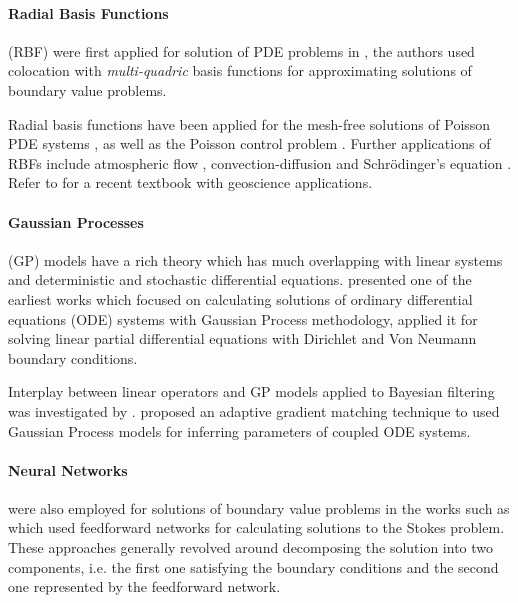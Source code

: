 \paragraph{Radial Basis Functions} (RBF) were first applied for solution of PDE problems in 
\citet{KANSA1990147}, the authors used colocation with \emph{multi-quadric} basis functions for 
approximating solutions of boundary value problems.

Radial basis functions have been applied for the mesh-free solutions of Poisson PDE systems 
\citep{AMINATAEI20082887,DUAN200866,DUAN2006394,CNM:CNM419}, as well as the Poisson control problem 
\citep{Pearson2013}. Further applications of RBFs include atmospheric flow 
\citep{Tillenius2015406}, convection-diffusion \citep{Safdari-Vaighani2015} and Schr\"{o}dinger's 
equation \citep{doi:10.1137/120893975}. Refer to \citet{fornberg2015} for a recent textbook with 
geoscience applications.

\paragraph{Gaussian Processes} (GP) models \citep{Rasmussen:2005:GPM:1162254} have a rich theory 
which has much overlapping with linear systems and deterministic and stochastic differential 
equations. \citet{Skilling1992} presented one of the earliest works which focused on calculating 
solutions of ordinary differential equations (ODE) systems with Gaussian Process methodology, 
\citet{Graepel} applied it for solving linear partial differential equations with Dirichlet and 
Von Neumann boundary conditions.

Interplay between linear operators and GP models applied to Bayesian filtering was investigated by 
\citet{Sarkka2011}. \citet{pmlr-v31-dondelinger13a} proposed an adaptive gradient matching 
technique to used Gaussian Process models for inferring parameters of coupled ODE systems.

\paragraph{Neural Networks} were also employed for solutions of boundary value problems in the 
works such as \citet{Lagaris,Aarts2001,TSOULOS20092385,Baymani2011} which used feedforward networks 
for calculating solutions to the Stokes problem. These approaches generally revolved around 
decomposing the solution into two components, i.e. the first one satisfying the boundary conditions 
and the second one represented by the feedforward network.


